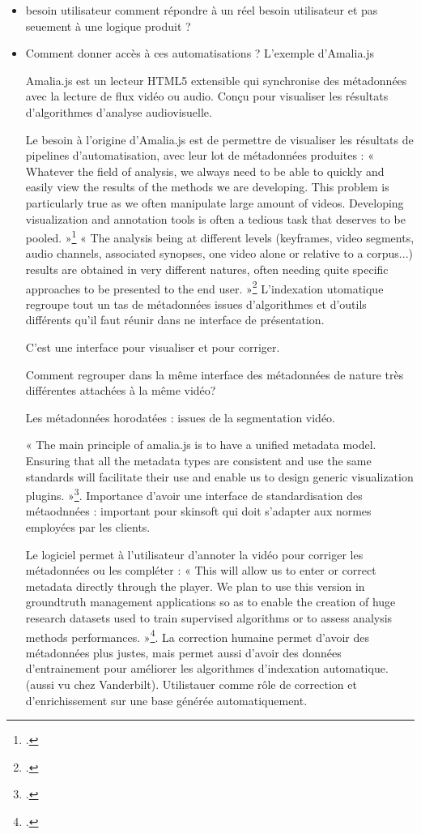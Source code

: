 \begin{itemize}
	\item besoin utilisateur 
	comment répondre à un réel besoin utilisateur et pas seuement à une logique produit ?
	
	\item Comment donner accès à ces automatisations ? L'exemple d'Amalia.js
	
	Amalia.js est un lecteur HTML5 extensible qui synchronise des métadonnées avec la lecture de flux vidéo ou audio. Conçu pour visualiser les résultats d’algorithmes d’analyse audiovisuelle.
	
	Le besoin à l'origine d'Amalia.js est de permettre de visualiser les résultats de pipelines d'automatisation, avec leur lot de métadonnées produites : « Whatever the field of analysis, we always need to be able to quickly and easily view the results of the methods we are developing. This problem is particularly true as we often manipulate large amount of videos. Developing visualization and annotation tools is often a tedious task that deserves to be pooled. »\footcite{herve2015}
	« The analysis being at different levels (keyframes, video segments, audio channels, associated synopses, one video alone or relative to a corpus...) results are obtained in very different natures, often needing quite specific approaches to be presented to the end user. »\footcite{herve2015} L'indexation utomatique regroupe tout un tas de métadonnées issues d'algorithmes et d'outils différents qu'il faut réunir dans ne interface de présentation. 
	
	C'est une interface pour visualiser et pour corriger.
	
	Comment regrouper dans la  même interface des métadonnées de nature très différentes attachées à la même vidéo?
	
	Les métadonnées horodatées : issues de la segmentation vidéo. 
	
	« The main principle of amalia.js is to have a unified metadata model. Ensuring that all the metadata types are consistent and use the same standards will facilitate their use and enable us to design generic visualization plugins. »\footcite{herve2015}. Importance d'avoir une interface de standardisation des métaodnnées : important pour skinsoft qui doit s'adapter aux normes employées par les clients. 
	
	Le logiciel permet à l'utilisateur d'annoter la vidéo pour corriger les métadonnées ou les compléter : « This will allow us to enter or correct metadata directly through the player. We plan to use this version in groundtruth management applications so as to enable the creation of huge research datasets used to train supervised algorithms or to assess analysis methods performances. »\footcite{herve2015}. La correction humaine permet d'avoir des métadonnées plus justes, mais permet aussi d'avoir des données d'entrainement pour améliorer les algorithmes d'indexation automatique. (aussi vu chez Vanderbilt). Utilistauer comme rôle de correction et d'enrichissement sur une base générée automatiquement. 
	
	
	
	
\end{itemize}